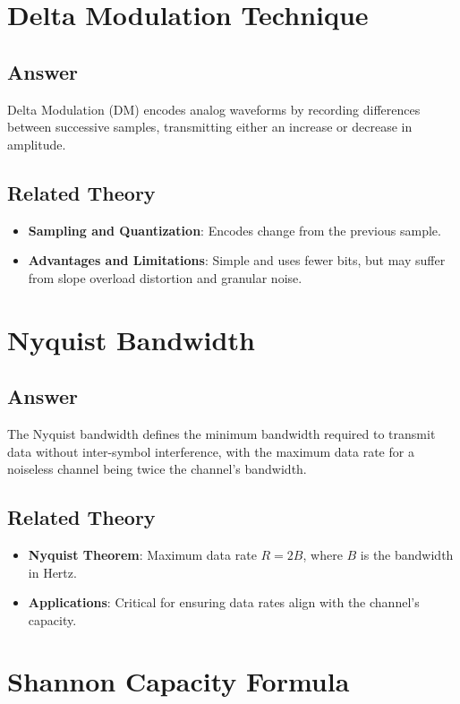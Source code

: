 \documentclass{article}
\begin{document}
\section{Delta Modulation Technique}
\subsection{Answer}
Delta Modulation (DM) encodes analog waveforms by recording differences between successive samples, transmitting either an increase or decrease in amplitude.

\subsection{Related Theory}
\begin{itemize}
    \item \textbf{Sampling and Quantization}: Encodes change from the previous sample.
    \item \textbf{Advantages and Limitations}: Simple and uses fewer bits, but may suffer from slope overload distortion and granular noise.
\end{itemize}

\section{Nyquist Bandwidth}
\subsection{Answer}
The Nyquist bandwidth defines the minimum bandwidth required to transmit data without inter-symbol interference, with the maximum data rate for a noiseless channel being twice the channel's bandwidth.

\subsection{Related Theory}
\begin{itemize}
    \item \textbf{Nyquist Theorem}: Maximum data rate \( R = 2B \), where \( B \) is the bandwidth in Hertz.
    \item \textbf{Applications}: Critical for ensuring data rates align with the channel's capacity.
\end{itemize}

\section{Shannon Capacity Formula}
\end{document}
